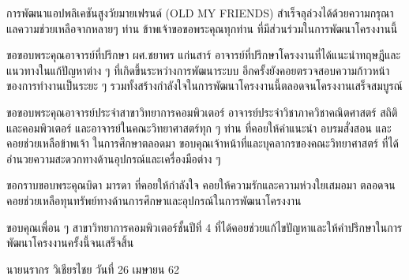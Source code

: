 \begin{acknowledgements} %
	การพัฒนาแอปพลิเคชันสูงวัยมายเฟรนด์ (OLD MY FRIENDS) สำเร็จลุล่วงได้ด้วยความกรุณาแลความช่วยเหลือจากหลายๆ ท่าน ข้าพเจ้าขอขอพระคุณทุกท่าน ที่มีส่วนร่วมในการพัฒนาโครงงานนี้
	
    ขอขอบพระคุณอาจารย์ที่ปรึกษา ผศ.ชยาพร แก่นสาร์ อาจารย์ที่ปรึกษาโครงงานที่ได้แนะนำทฤษฎีและแนวทางในแก้ปัญหาต่าง ๆ  ที่เกิดขึ้นระหว่างการพัฒนาระบบ อีกครั้งยังคอยตรวจสอบความก้าวหน้าของการทำงานเป็นระยะ ๆ รวมทั้งสร้างกำลังใจในการพัฒนาโครงงานนี้ตลอดจนโครงงานเสร็จสมบูรณ์
    
    ขอขอบพระคุณอาจารย์ประจำสาขาวิทยาการคอมพิวเตอร์ อาจารย์ประจำวิชาภาควิชาคณิตศาสตร์ สถิติ และคอมพิวเตอร์ และอาจารย์ในคณะวิทยาศาสตร์ทุก ๆ ท่าน ที่คอยให้คำแนะนำ อบรมสั่งสอน และคอยช่วยเหลือข้าพเจ้า
    ในการศึกษาตลอดมา ขอบคุณเจ้าหน้าที่และบุคลากรของคณะวิทยาศาสตร์ ที่ได้อำนวยความสะดวกทางด้านอุปกรณ์และเครื่องมือต่าง ๆ
  
  ขอกราบขอบพระคุณบิดา มารดา ที่คอยให้กำลังใจ คอยให้ความรักและความห่วงใยเสมอมา
  ตลอดจนคอยช่วยเหลือทุนทรัพย์ทางด้านการศึกษาและอุปกรณ์ในการพัฒนาโครงงาน

  ขอบคุณเพื่อน ๆ สาขาวิทยาการคอมพิวเตอร์ชั้นปีที่ 4 ที่ได้คอยช่วยแก้ไขปัญหาและให้คำปรึกษาในการพัฒนาโครงงานครั้งนี้จนเสร็จสิ้น
    
\end{acknowledgements}

\begin{flushright}
    นายนรากร วิเชียรไชย
    \vspace{-5mm}
    วันที่ 26 เมษายน 62
\end{flushright}
